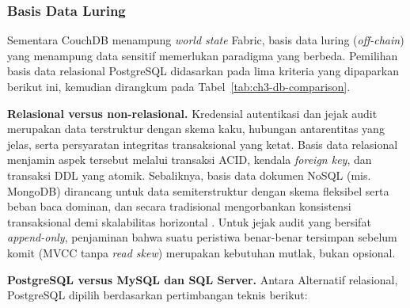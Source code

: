 \subsubsection{Basis Data Luring}

Sementara CouchDB menampung \textit{world state} Fabric, basis data luring
(\textit{off-chain}) yang menampung data sensitif memerlukan paradigma yang
berbeda. Pemilihan basis data relasional PostgreSQL didasarkan pada lima
kriteria yang dipaparkan berikut ini, kemudian dirangkum pada
Tabel~\ref{tab:ch3-db-comparison}.

\textbf{Relasional versus non-relasional.} Kredensial autentikasi dan jejak audit
merupakan data terstruktur dengan skema kaku, hubungan antarentitas yang jelas,
serta persyaratan integritas transaksional yang ketat. Basis data relasional
menjamin aspek tersebut melalui transaksi ACID, kendala \textit{foreign key},
dan transaksi DDL yang atomik. Sebaliknya, basis data dokumen NoSQL (mis.
MongoDB) dirancang untuk data semiterstruktur dengan skema fleksibel serta beban
baca dominan, dan secara tradisional mengorbankan konsistensi transaksional demi
skalabilitas horizontal \cite{ispirer2024nosqlfinance}. Untuk jejak audit yang
bersifat \textit{append-only}, penjaminan bahwa suatu peristiwa benar-benar
tersimpan sebelum komit (MVCC tanpa \textit{read skew}) merupakan kebutuhan
mutlak, bukan opsional.

\textbf{PostgreSQL versus MySQL dan SQL Server.} Antara Alternatif relasional,
PostgreSQL dipilih berdasarkan pertimbangan teknis berikut:

